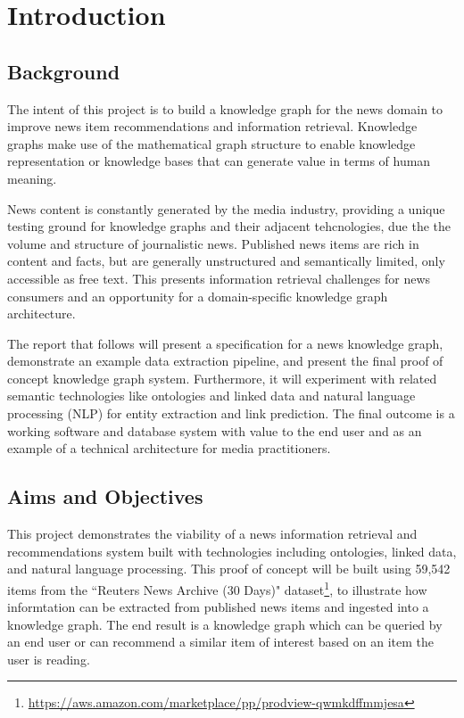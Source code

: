\documentclass[11pt]{article}
\begin{document}
\newpage
\section{Introduction}
\subsection{Background}
The intent of this project is to build a knowledge graph for the news domain to improve news item recommendations and information retrieval. Knowledge graphs make use of the mathematical graph structure to enable knowledge representation or knowledge bases that can generate value in terms of human meaning.

News content is constantly generated by the media industry, providing a unique testing ground for knowledge graphs and their adjacent tehcnologies, due the the volume and structure of journalistic news. Published news items are rich in content and facts, but are generally unstructured and semantically limited, only accessible as free text. This presents information retrieval challenges for news consumers and an opportunity for a domain-specific knowledge graph architecture.

The report that follows will present a specification for a news knowledge graph, demonstrate an example data extraction pipeline, and present the final proof of concept knowledge graph system. Furthermore, it will experiment with related semantic technologies like ontologies and linked data and natural language processing (NLP) for entity extraction and link prediction. The final outcome is a working software and database system with value to the end user and as an example of a technical architecture for media practitioners.

\subsection{Aims and Objectives}
This project demonstrates the viability of a news information retrieval and recommendations system built with technologies including ontologies, linked data, and natural language processing. This proof of concept will be built using 59,542 items from the ``Reuters News Archive (30 Days)" dataset\footnote{\url{https://aws.amazon.com/marketplace/pp/prodview-qwmkdffmmjesa}}, to illustrate how informtation can be extracted from published news items and ingested into a knowledge graph. The end result is a knowledge graph which can be queried by an end user or can recommend a similar item of interest based on an item the user is reading.
\end{document}
